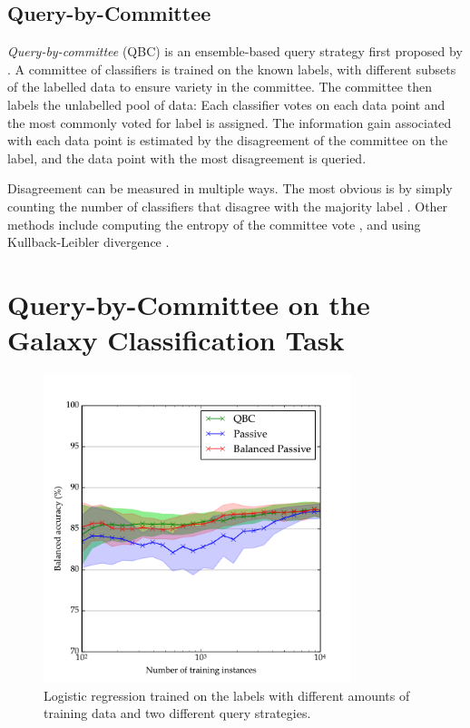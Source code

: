 

    \subsection{Query-by-Committee}
    \label{sec:qbc}

        \emph{Query-by-committee} (QBC) is an ensemble-based query strategy
        first proposed by \citet{seung92}. A committee of classifiers is trained
        on the known labels, with different subsets of the labelled data to
        ensure variety in the committee. The committee then labels the
        unlabelled pool of data: Each classifier votes on each data point and
        the most commonly voted for label is assigned. The information gain
        associated with each data point is estimated by the disagreement of the
        committee on the label, and the data point with the most disagreement is
        queried.

        Disagreement can be measured in multiple ways. The most obvious is by
        simply counting the number of classifiers that disagree with the
        majority label \citep{seung92}. Other methods include computing the
        entropy of the committee vote \citep{mccallum98, dagan95}, and using
        Kullback-Leibler divergence \citep{mccallum98}.

\section{Query-by-Committee on the Galaxy Classification Task}
\label{sec:rgz-qbc}

    \begin{figure}
        \centering
        \includegraphics[width=0.8\textwidth]
            {images/experiments/rgz_qbc.pdf}
        \caption{Logistic regression trained on the \citeauthor{norris06}
            labels with different amounts of training data and two different
            query strategies.}
        \label{fig:rgz-qbc}
    \end{figure}

